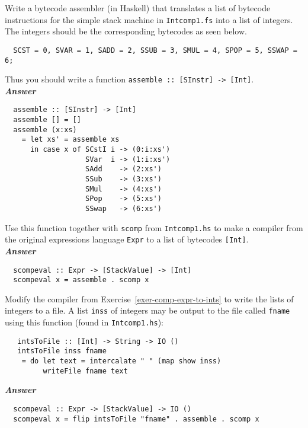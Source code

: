 \documentclass[a4paper]{article}
\begin{document}
\begin{exercise}\label{exer-comp-expr-to-ints}
  Write a bytecode assembler (in Haskell) that translates a list
  of bytecode instructions for the simple stack machine in
  \texttt{Intcomp1.fs} into a list of integers.  The integers should be
  the corresponding bytecodes as seen below.
  {\codesetup\begin{verbatim}
  SCST = 0, SVAR = 1, SADD = 2, SSUB = 3, SMUL = 4, SPOP = 5, SSWAP = 6;\end{verbatim}}
  \noindent 
  Thus you should write a function
  \texttt{assemble ::\ [SInstr] -> [Int]}.\\
  
  \noindent
\textbf{\emph{Answer}}
  {\codesetup\begin{verbatim}
  assemble :: [SInstr] -> [Int]
  assemble [] = []
  assemble (x:xs) 
    = let xs' = assemble xs 
      in case x of SCstI i -> (0:i:xs')
                   SVar  i -> (1:i:xs')
                   SAdd    -> (2:xs')
                   SSub    -> (3:xs')
                   SMul    -> (4:xs')
                   SPop    -> (5:xs')
                   SSwap   -> (6:xs')
  \end{verbatim}}

  Use this function together with \texttt{scomp} from
  \texttt{Intcomp1.hs} to make a compiler from the original expressions
  language \texttt{Expr} to a list of bytecodes \texttt{[Int]}.\\
  
  \noindent
\textbf{\emph{Answer}}
  {\codesetup\begin{verbatim}
  scompeval :: Expr -> [StackValue] -> [Int]
  scompeval x = assemble . scomp x
  \end{verbatim}}

\end{exercise}


\begin{exercise}\label{exer-read-ints-into-stack-machine}
  Modify the compiler from Exercise~\ref{exer-comp-expr-to-ints} to
  write the lists of integers to a file.  A list \texttt{inss} of
  integers may be output to the file called \texttt{fname} using this
  function (found in \texttt{Intcomp1.hs}):

{\codesetup\begin{verbatim}
   intsToFile :: [Int] -> String -> IO ()
   intsToFile inss fname 
    = do let text = intercalate " " (map show inss)
         writeFile fname text
\end{verbatim}}
\noindent
\textbf{\emph{Answer}}
  {\codesetup\begin{verbatim}
  scompeval :: Expr -> [StackValue] -> IO ()
  scompeval x = flip intsToFile "fname" . assemble . scomp x
  \end{verbatim}}

\end{exercise}
\end{document}
